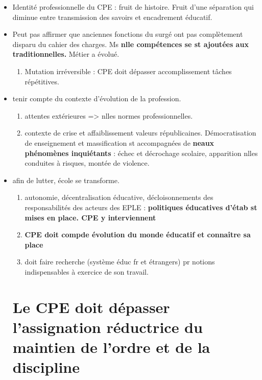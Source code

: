\documentclass[12pt]{report}
\begin{document}
\begin{itemize}
\begin{itemize}

\item Identité professionnelle du CPE : fruit de histoire. Fruit d'une séparation qui diminue entre transmission des savoirs et encadrement éducatif.\\

\item Peut pas affirmer que anciennes fonctions du surgé ont pas complètement disparu du cahier des charges. Ms \textbf{nlle compétences se st ajoutées aux traditionnelles.} Métier a évolué.
\begin{enumerate}
\item  Mutation irréversible : CPE doit dépasser accomplissement tâches répétitives. \\
\end{enumerate}

\item tenir compte du contexte d'évolution de la profession. 
\begin{enumerate}
\item attentes extérieures => nlles normes professionnelles. \\
\item contexte de crise et affaiblissement valeurs républicaines. Démocratisation de enseignement et massification st accompagnées de \textbf{neaux phénomènes inquiétants} : échec et décrochage scolaire, apparition nlles conduites à risques, montée de violence. \\
\end{enumerate}

\item afin de lutter, école se transforme.
\begin{enumerate}
\item autonomie, décentralisation éducative, décloisonnements des responsabilités des acteurs des EPLE : \textbf{politiques éducatives d'étab st mises en place. CPE y interviennent} \\

\item \textbf{CPE doit compde évolution du monde éducatif et connaître sa place} \\

\item doit faire recherche (système éduc fr et étrangers) pr notions indispensables à exercice de son travail.
\end{enumerate}

\section{Le CPE doit dépasser l'assignation réductrice du maintien de l'ordre et de la discipline}


\end{itemize}
\end{itemize}
\end{document}
